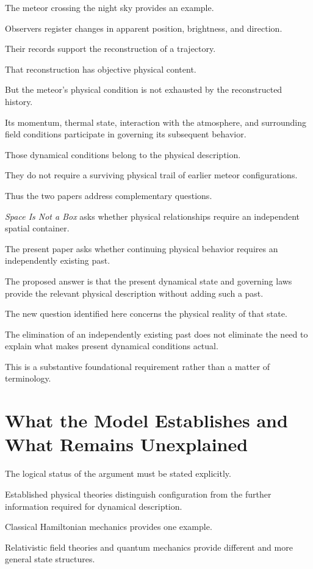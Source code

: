 \documentclass[12pt,onecolumn]{article}
\begin{document}
The meteor crossing the night sky provides an example.

Observers register changes in apparent position, brightness, and direction.

Their records support the reconstruction of a trajectory.

That reconstruction has objective physical content.

But the meteor's physical condition is not exhausted by the reconstructed history.

Its momentum, thermal state, interaction with the atmosphere, and surrounding field conditions participate in governing its subsequent behavior.

Those dynamical conditions belong to the physical description.

They do not require a surviving physical trail of earlier meteor configurations.

Thus the two papers address complementary questions.

\emph{Space Is Not a Box} asks whether physical relationships require an independent spatial container.

The present paper asks whether continuing physical behavior requires an independently existing past.

The proposed answer is that the present dynamical state and governing laws provide the relevant physical description without adding such a past.

The new question identified here concerns the physical reality of that state.

The elimination of an independently existing past does not eliminate the need to explain what makes present dynamical conditions actual.

This is a substantive foundational requirement rather than a matter of terminology.


\section{What the Model Establishes and What Remains Unexplained}

The logical status of the argument must be stated explicitly.

Established physical theories distinguish configuration from the further information required for dynamical description.

Classical Hamiltonian mechanics provides one example.

Relativistic field theories and quantum mechanics provide different and more general state structures.
\end{document}
